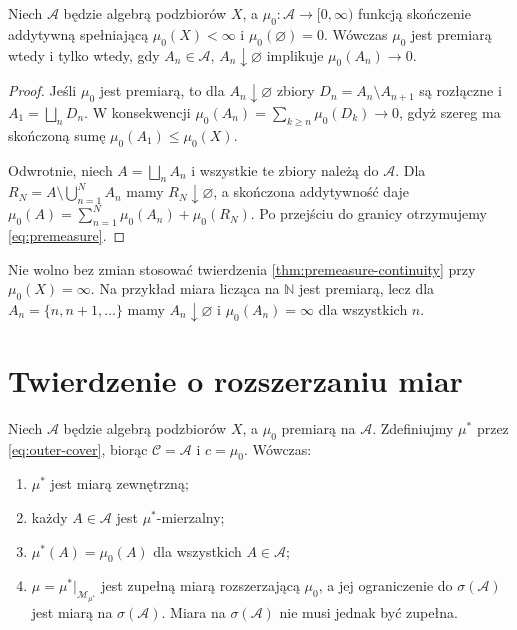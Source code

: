 \begin{twierdzenie}
\label{thm:premeasure-continuity}
Niech $\mathcal A$ będzie algebrą podzbiorów $X$, a
$\mu_0:\mathcal A\to[0,\infty)$ funkcją skończenie addytywną
spełniającą $\mu_0(X)<\infty$ i $\mu_0(\varnothing)=0$.
Wówczas $\mu_0$ jest premiarą wtedy i tylko wtedy, gdy
$A_n\in\mathcal A$, $A_n\downarrow\varnothing$ implikuje
$\mu_0(A_n)\to0$.
\end{twierdzenie}

\begin{proof}
Jeśli $\mu_0$ jest premiarą, to dla
$A_n\downarrow\varnothing$ zbiory $D_n=A_n\setminus A_{n+1}$
są rozłączne i $A_1=\bigsqcup_nD_n$.
W konsekwencji
$\mu_0(A_n)=\sum_{k\ge n}\mu_0(D_k)\to0$,
gdyż szereg ma skończoną sumę $\mu_0(A_1)\le\mu_0(X)$.

Odwrotnie, niech $A=\bigsqcup_n A_n$ i wszystkie te zbiory
należą do $\mathcal A$. Dla
$R_N=A\setminus\bigcup_{n=1}^N A_n$ mamy
$R_N\downarrow\varnothing$, a skończona addytywność daje
$\mu_0(A)=\sum_{n=1}^N\mu_0(A_n)+\mu_0(R_N)$.
Po przejściu do granicy otrzymujemy \eqref{eq:premeasure}.
\end{proof}

\begin{uwaga}
Nie wolno bez zmian stosować twierdzenia
\ref{thm:premeasure-continuity} przy $\mu_0(X)=\infty$.
Na przykład miara licząca na $\mathbb N$ jest premiarą,
lecz dla $A_n=\{n,n+1,\ldots\}$ mamy $A_n\downarrow\varnothing$
i $\mu_0(A_n)=\infty$ dla wszystkich $n$.
\end{uwaga}

\section{Twierdzenie o rozszerzaniu miar}

\begin{twierdzenie}
\label{thm:extension-caratheodory}
Niech $\mathcal A$ będzie algebrą podzbiorów $X$, a
$\mu_0$ premiarą na $\mathcal A$. Zdefiniujmy $\mu^*$
przez \eqref{eq:outer-cover}, biorąc $\mathcal C=\mathcal A$
i $c=\mu_0$. Wówczas:
\begin{enumerate}[label=\textup{(\roman*)}]
\item $\mu^*$ jest miarą zewnętrzną;
\item każdy $A\in\mathcal A$ jest $\mu^*$-mierzalny;
\item $\mu^*(A)=\mu_0(A)$ dla wszystkich $A\in\mathcal A$;
\item $\mu=\mu^*|_{\mathcal M_{\mu^*}}$ jest zupełną miarą
rozszerzającą $\mu_0$, a jej ograniczenie do
$\sigma(\mathcal A)$ jest miarą na $\sigma(\mathcal A)$.
Miara na $\sigma(\mathcal A)$ nie musi jednak być zupełna.
\end{enumerate}
\end{twierdzenie}

